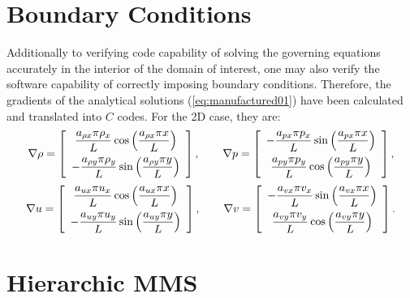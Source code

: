 \documentclass[10pt]{article}
\begin{document}
\section{Boundary Conditions}
Additionally to verifying code capability of solving the governing equations accurately in the interior of the domain of interest, one may also verify the software capability of correctly imposing boundary conditions. Therefore, the gradients of the  analytical solutions (\ref{eq:manufactured01}) have been calculated and translated into $C$ codes. For the 2D case, they are:
\begin{equation*}
\nabla  \rho= \left[ \begin{array}{c}
 \dfrac{  a_{\rho x}  \pi \rho_x}{L} \cos\left( \dfrac{ a_{\rho x}  \pi  x}{L}\right)\vspace{5pt} \\
-\dfrac{  a_{\rho y}  \pi \rho_y}{L} \sin\left( \dfrac{ a_{\rho y}  \pi  y}{L}\right)
 \end{array} \right],
\qquad
\nabla p = \left[ \begin{array}{c}
- \dfrac{  a_{px}  \pi p_x}{L} \sin\left( \dfrac{ a_{px}  \pi  x}{L}\right)\vspace{5pt}\\
  \dfrac{  a_{py}  \pi p_y}{L} \cos\left( \dfrac{ a_{py}  \pi  y}{L}\right)
\end{array} \right],
\end{equation*}
%
\begin{equation*}
\nabla u = \left[ \begin{array}{c}
  \dfrac{  a_{ux}  \pi u_x}{L} \cos\left( \dfrac{ a_{ux}  \pi  x}{L}\right)\vspace{5pt}\\
 -   \dfrac{  a_{uy}  \pi u_y}{L} \sin\left( \dfrac{ a_{uy}  \pi  y}{L}\right)
\end{array} \right],
\qquad
\nabla  v= \left[ \begin{array}{c}
-  \dfrac{  a_{vx}  \pi v_x}{L}  \sin\left( \dfrac{ a_{vx}  \pi  x}{L}\right)\vspace{5pt}\\
    \dfrac{  a_{vy}  \pi v_y}{L} \cos\left( \dfrac{ a_{vy}  \pi  y}{L}\right)
\end{array} \right].
\end{equation*}

\section{Hierarchic MMS}
\end{document}
